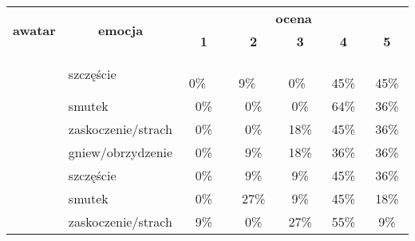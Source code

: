 \begin{table}[h]
\centering
\begin{tabular}{|c|l|c|c|c|c|c|} 
\hline
\multirow{2}{*}{\textbf{awatar}} & \multicolumn{1}{c|}{\multirow{2}{*}{\textbf{emocja}}} & \multicolumn{5}{c|}{\textbf{ocena}}                                                                                                   \\ 
\cline{3-7}
                                 & \multicolumn{1}{c|}{}                                 & \textbf{1} & \textbf{2} & \textbf{3}                       & \textbf{4}                         & \textbf{5}                          \\ 
\hhline{|=======|}
\multirow{4}{*}{\ref{avatar_1}}        & szczęście                                             & ~ 0\%~~    & ~ 9\%~~    & ~ 0\%~                           & \textcolor[rgb]{0,0.588,0}{~ 45\%} & \textcolor[rgb]{0,0.588,0}{~ 45\%}  \\ 
\cline{2-7}
                                 & smutek                                                & 0\%        & 0\%        & 0\%                              & \textcolor[rgb]{0,0.588,0}{64\%}   & 36\%                                \\ 
\cline{2-7}
                                 & zaskoczenie/strach                                    & 0\%        & 0\%        & 18\%                             & \textcolor[rgb]{0,0.588,0}{45\%}   & 36\%                                \\ 
\cline{2-7}
                                 & gniew/obrzydzenie                                     & 0\%        & 9\%        & 18\%                             & \textcolor[rgb]{0,0.588,0}{36\%}   & \textcolor[rgb]{0,0.588,0}{36\%}    \\ 
\hhline{|=======|}
\multirow{4}{*}{\ref{avatar_2}}           & szczęście                                             & 0\%        & 9\%        & 9\%                              & \textcolor[rgb]{0,0.588,0}{45\%}   & 36\%                                \\ 
\cline{2-7}
                                 & smutek                                                & 0\%        & 27\%       & 9\%                              & \textcolor[rgb]{0,0.588,0}{45\%}   & 18\%                                \\ 
\cline{2-7}
                                 & zaskoczenie/strach                                    & 9\%        & 0\%        & 27\%                             & \textcolor[rgb]{0,0.588,0}{55\%}   & 9\%                                 \\ 

\end{tabular}
\end{table}
